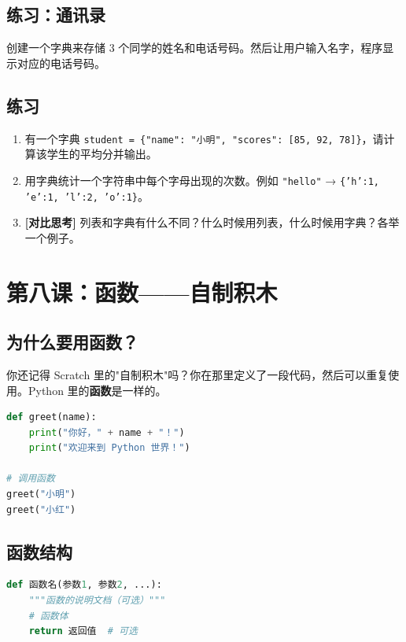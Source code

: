 \documentclass[a4paper,12pt]{ctexart}
\begin{document}
\subsection*{练习：通讯录}

创建一个字典来存储 3 个同学的姓名和电话号码。然后让用户输入名字，程序显示对应的电话号码。

\subsection*{练习}

\begin{enumerate}
  \item 有一个字典 \texttt{student = \{"name": "小明", "scores": [85, 92, 78]\}}，请计算该学生的平均分并输出。
  \item 用字典统计一个字符串中每个字母出现的次数。例如 \texttt{"hello"} → \texttt{\{'h':1, 'e':1, 'l':2, 'o':1\}}。
  \item \textbf{[对比思考]} 列表和字典有什么不同？什么时候用列表，什么时候用字典？各举一个例子。
\end{enumerate}

\section*{第八课：函数——自制积木}

\subsection*{为什么要用函数？}

你还记得 Scratch 里的"自制积木"吗？你在那里定义了一段代码，然后可以重复使用。Python 里的\textbf{函数}是一样的。

\begin{lstlisting}[language=Python]
def greet(name):
    print("你好，" + name + "！")
    print("欢迎来到 Python 世界！")

# 调用函数
greet("小明")
greet("小红")
\end{lstlisting}

\subsection*{函数结构}

\begin{lstlisting}[language=Python]
def 函数名(参数1, 参数2, ...):
    """函数的说明文档（可选）"""
    # 函数体
    return 返回值  # 可选
\end{lstlisting}
\end{document}
